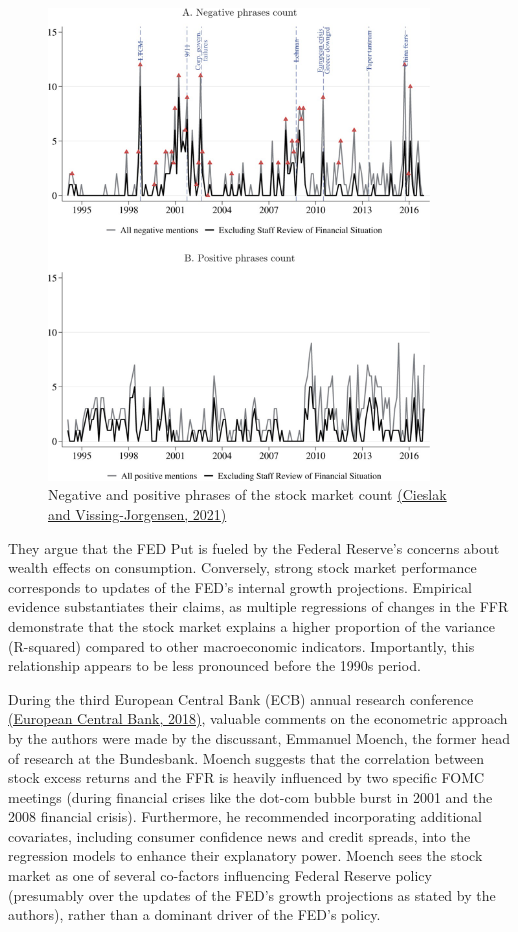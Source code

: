 \begin{figure}[h]
    \centering
        \label{cies21_fig5}
    \includegraphics[width=0.9\textwidth]{figures/cies21/Figure5}
    \caption{Negative and positive phrases of the stock market count \hyperref[item:cieslak_economics_2021]{(Cieslak and Vissing-Jorgensen,  2021)}}
\end{figure}

They argue that the FED Put is fueled by the Federal Reserve's concerns about wealth effects on consumption. Conversely, strong stock market performance corresponds to updates of the FED’s internal growth projections. Empirical evidence substantiates their claims, as multiple regressions of changes in the FFR demonstrate that the stock market explains a higher proportion of the variance (R-squared) compared to other macroeconomic indicators. Importantly, this relationship appears to be less pronounced before the 1990s period.  

During the third European Central Bank (ECB) annual research conference \hyperref[item:european_central_bank_third_2018]{ (European Central Bank,  2018)}, valuable comments on the econometric approach by the authors were made by the discussant, Emmanuel Moench, the former head of research at the Bundesbank. Moench suggests that the correlation between stock excess returns and the FFR is heavily influenced by two specific FOMC meetings (during financial crises like the dot-com bubble burst in 2001 and the 2008 financial crisis). Furthermore, he recommended incorporating additional covariates, including consumer confidence news and credit spreads, into the regression models to enhance their explanatory power. Moench sees the stock market as one of several co-factors influencing Federal Reserve policy (presumably over the updates of the FED's growth projections as stated by the authors), rather than a dominant driver of the FED's policy.

